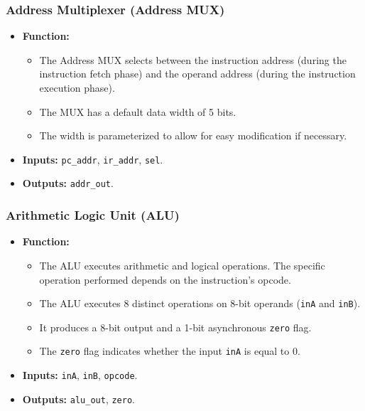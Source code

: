 \subsubsection*{Address Multiplexer (Address MUX)}
\begin{itemize}
	\item \textbf{Function:}
	      \begin{itemize}
		      \item The Address MUX selects between the instruction address (during the instruction fetch phase) and the operand address (during the instruction execution phase).
		      \item The MUX has a default data width of 5 bits.
		      \item The width is parameterized to allow for easy modification if necessary.
	      \end{itemize}
	\item \textbf{Inputs:} \texttt{pc\_addr}, \texttt{ir\_addr}, \texttt{sel}.
	\item \textbf{Outputs:} \texttt{addr\_out}.
\end{itemize}

\subsubsection*{Arithmetic Logic Unit (ALU)}
\begin{itemize}
	\item \textbf{Function:}
	      \begin{itemize}
		      \item The ALU executes arithmetic and logical operations. The specific operation performed depends on the instruction's opcode.
		      \item The ALU executes 8 distinct operations on 8-bit operands (\texttt{inA} and \texttt{inB}).
		      \item It produces a 8-bit output and a 1-bit asynchronous \texttt{zero} flag.
		      \item The \texttt{zero} flag indicates whether the input \texttt{inA} is equal to 0.
	      \end{itemize}
	\item \textbf{Inputs:} \texttt{inA}, \texttt{inB}, \texttt{opcode}.
	\item \textbf{Outputs:} \texttt{alu\_out}, \texttt{zero}.
\end{itemize}

